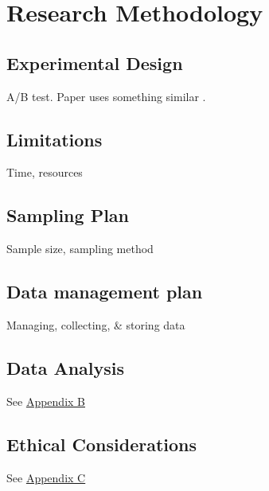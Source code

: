 \section{Research Methodology}

\subsection{Experimental Design}
A/B test. Paper uses something similar \cite{constrained-layouts}.
\subsection{Limitations}
Time, resources

\subsection{Sampling Plan}
Sample size, sampling method

\subsection{Data management plan}
Managing, collecting, \& storing data

\subsection{Data Analysis}
See \hyperref[append:b]{Appendix B}

\subsection{Ethical Considerations}
See \hyperref[append:c]{Appendix C}